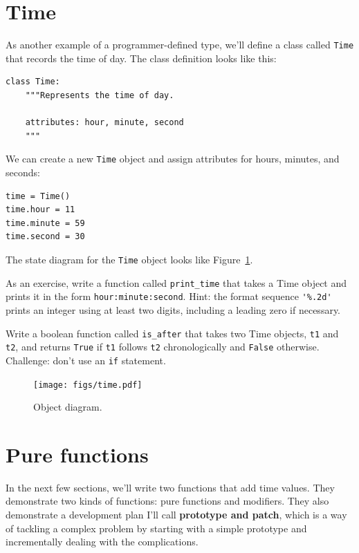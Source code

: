 \documentclass[10pt]{book}
\begin{document}
\section{Time}
\label{isafter}

As another example of a programmer-defined type, we'll define a class
called {\tt Time} that records the time of day.  The class definition
looks like this: 
  

\begin{verbatim}
class Time:
    """Represents the time of day.
       
    attributes: hour, minute, second
    """
\end{verbatim}
%
We can create a new {\tt Time} object and assign
attributes for hours, minutes, and seconds:

\begin{verbatim}
time = Time()
time.hour = 11
time.minute = 59
time.second = 30
\end{verbatim}
%
The state diagram for the {\tt Time} object looks like Figure~\ref{fig.time}.

As an exercise, write a function called \verb"print_time" that takes a 
Time object and prints it in the form {\tt hour:minute:second}.
Hint: the format sequence \verb"'%.2d'" prints an integer using
at least two digits, including a leading zero if necessary.

Write a boolean function called \verb"is_after" that
takes two Time objects, {\tt t1} and {\tt t2}, and
returns {\tt True} if {\tt t1} follows {\tt t2} chronologically and
{\tt False} otherwise.  Challenge: don't use an {\tt if} statement.

\begin{figure}
\centerline
{\texttt{[image: figs/time.pdf]}}
\caption{Object diagram.}
\label{fig.time}
\end{figure}


\section{Pure functions}

In the next few sections, we'll write two functions that add time
values.  They demonstrate two kinds of functions: pure functions and
modifiers.  They also demonstrate a development plan I'll call {\bf
  prototype and patch}, which is a way of tackling a complex problem
by starting with a simple prototype and incrementally dealing with the
complications.
\end{document}
